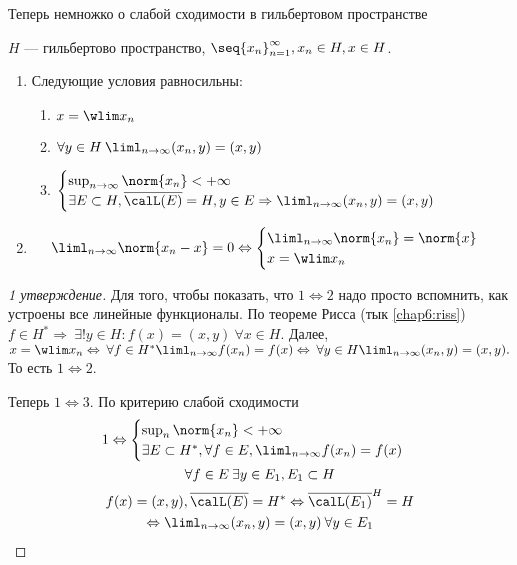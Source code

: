 \documentclass[document]{subfiles}
\begin{document}
Теперь немножко о слабой сходимости в гильбертовом пространстве

\begin{theorem}
    $H$ --- гильбертово пространство, $\seq{x_n}^\infty_{n=1}, x_n \in H, x \in H$.
    \begin{enumerate}
        \item Следующие условия равносильны:
        \begin{enumerate}
            \item $x = \wlim x_n$ 
            \item $\forall y \in H \: \liml_{n \to \infty} (x_n, y) = (x,y)$
            \item $\begin{cases}
                \sup_{n \to \infty} \norm{x_n} < +\infty \\
                \exists E \subset H, \overline{\calL(E)} = H, y \in E \Rightarrow \liml_{n \to \infty} (x_n, y) = (x,y)
            \end{cases}$
        \end{enumerate}
        \item \[\liml_{n \to \infty} \norm{x_n - x} = 0 \Leftrightarrow \begin{cases}
            \liml_{n \to \infty} \norm{x_n} = \norm{x} \\
            x = \wlim x_n
        \end{cases}  \]
    \end{enumerate}
\end{theorem}

\begin{proof}[1 утверждение]
    Для того, чтобы показать, что $1 \Leftrightarrow 2$ надо просто вспомнить, как устроены все линейные функционалы. 
    По теореме Рисса (тык \ref{chap6:riss})  $f \in H^* \Rightarrow \: \exists! y \in H : f(x) = (x,y) \: \forall x \in H$. Далее,
    $x = \wlim x_n \Leftrightarrow \: \forall f \in H^* \liml_{n \to \infty} f(x_n) = f(x) \Leftrightarrow \: \forall y \in H \liml_{n \to \infty} (x_n,y) = (x,y).$
    То есть $1 \Leftrightarrow 2$. 

    Теперь $1 \Leftrightarrow 3$. По критерию слабой сходимости 
    \begin{gather*}
        1 \Leftrightarrow \begin{cases}
            \sup_n \norm{x_n} < +\infty \\
            \exists E \subset H^*, \forall f \in E, \liml_{n \to \infty} f(x_n) = f(x)
        \end{cases}\\
        \forall f \in E \: \exists y \in E_1, E_1 \subset H \\
        f(x) = (x,y), \overline{\calL(E)} = H^* \Leftrightarrow \overline{\calL(E_1)}^H = H \\
        \Leftrightarrow \liml_{n \to \infty} (x_n, y) = (x,y) \: \forall y \in E_1
    \end{gather*}
\end{proof}
\end{document}
